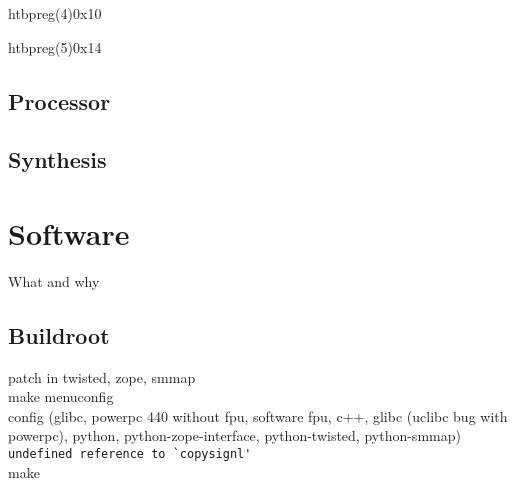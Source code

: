 \documentclass[11pt,technote,a4paper,twocolumn]{IEEEtran}
\begin{document}
\begin{register}{htbp}{reg(4)}{0x10}%
    \label{reg4}%
    \regnewline%
\end{register}
\begin{register}{htbp}{reg(5)}{0x14}%
    \label{reg5}%
    \regnewline%
\end{register}
\subsection{Processor}
\subsection{Synthesis}
\label{sec:synthesis}
\section{Software}
What and why
\subsection{Buildroot}
patch in twisted, zope, smmap\\
make menuconfig\\
config (glibc, powerpc 440 without fpu, software fpu, c++, glibc (uclibc bug with powerpc), python, python-zope-interface, python-twisted, python-smmap)\\
\verb+undefined reference to `copysignl'+\\
make
\end{document}
